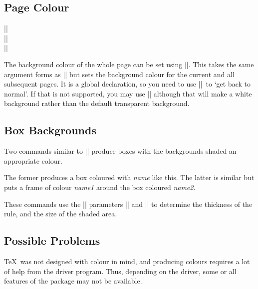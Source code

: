 \subsection{Page Colour}


\begin{decl}
|\pagecolor|\\
|\pagecolor|\\
|\nopagecolor|
\end{decl}

The background colour of the whole page can be set using
|\pagecolor|. This takes the same argument forms as |\color| but sets
the background colour for the current and all subsequent pages. It is
a global declaration, so you need to  use
|\nopagecolor|\ to `get back to normal'.
If that is not supported, you may use |\pagecolor{white}| although that
will make a white background rather than the default transparent background.

\subsection{Box Backgrounds}
Two commands similar to |\fbox| produce boxes with the backgrounds
shaded an appropriate colour.



The former produces a box coloured with \emph{name}
\colorbox{mygrey}{like this}. The latter is similar but puts a frame of
colour \emph{name1} around the box coloured \emph{name2}.

These commands use the |\fbox| parameters |\fboxrule| and |\fboxsep|
to determine the thickness of the rule, and the size of the shaded area.

\subsection{Possible Problems}

\TeX\ was not designed with colour in mind, and producing colours
requires a lot of help from the driver program. Thus, depending on the
driver, some or all features of the  package may not be
available.

